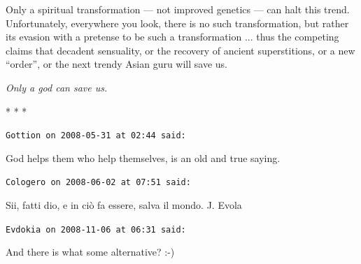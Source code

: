 Only a spiritual transformation --- not improved genetics --- can halt this trend. Unfortunately, everywhere you look, there is no such transformation, but rather its evasion with a pretense to be such a transformation ... thus the competing claims that decadent sensuality, or the recovery of ancient superstitions, or a new ``order'', or the next trendy Asian guru will save us.

\emph{Only a god can save us.}




\begin{center}* * *\end{center}

\begin{footnotesize}
\begin{sffamily}
\texttt{Gottion on 2008-05-31 at 02:44 said:}

God helps them who help themselves, is an old and true saying.

\hfill

\texttt{Cologero on 2008-06-02 at 07:51 said:}

Sii, fatti dio, e in ciò fa essere, salva il mondo. J. Evola

\hfill

\texttt{Evdokia on 2008-11-06 at 06:31 said:}

And there is what some alternative? :-)


\hfill

\end{sffamily}
\end{footnotesize}

